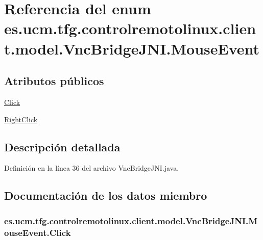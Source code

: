 \hypertarget{enumes_1_1ucm_1_1tfg_1_1controlremotolinux_1_1client_1_1model_1_1VncBridgeJNI_1_1MouseEvent}{\section{Referencia del enum es.\-ucm.\-tfg.\-controlremotolinux.\-client.\-model.\-Vnc\-Bridge\-J\-N\-I.\-Mouse\-Event}
\label{enumes_1_1ucm_1_1tfg_1_1controlremotolinux_1_1client_1_1model_1_1VncBridgeJNI_1_1MouseEvent}
}
\subsection*{Atributos públicos}
\begin{DoxyCompactItemize}
\item 
\hyperlink{enumes_1_1ucm_1_1tfg_1_1controlremotolinux_1_1client_1_1model_1_1VncBridgeJNI_1_1MouseEvent_abe1dcbcc087c2504c7e9354056c64424}{Click}
\item 
\hyperlink{enumes_1_1ucm_1_1tfg_1_1controlremotolinux_1_1client_1_1model_1_1VncBridgeJNI_1_1MouseEvent_a2436e1521d0a97377bc32586e630cdd8}{Right\-Click}
\end{DoxyCompactItemize}


\subsection{Descripción detallada}


Definición en la línea 36 del archivo Vnc\-Bridge\-J\-N\-I.\-java.



\subsection{Documentación de los datos miembro}
\hypertarget{enumes_1_1ucm_1_1tfg_1_1controlremotolinux_1_1client_1_1model_1_1VncBridgeJNI_1_1MouseEvent_abe1dcbcc087c2504c7e9354056c64424}{
\subsubsection[{Click}]{\setlength{\rightskip}{0pt plus 5cm}es.\-ucm.\-tfg.\-controlremotolinux.\-client.\-model.\-Vnc\-Bridge\-J\-N\-I.\-Mouse\-Event.\-Click}}\label{enumes_1_1ucm_1_1tfg_1_1controlremotolinux_1_1client_1_1model_1_1VncBridgeJNI_1_1MouseEvent_abe1dcbcc087c2504c7e9354056c64424}



